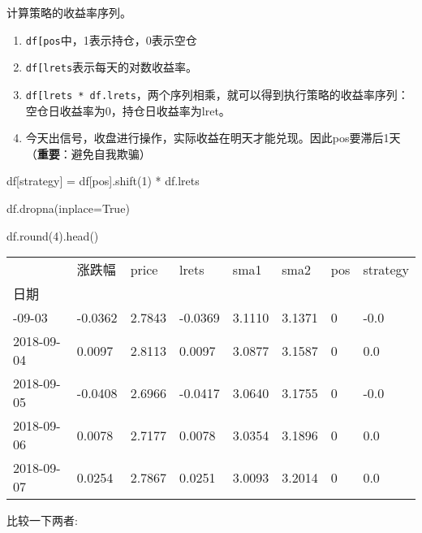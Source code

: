 \documentclass[
  letterpaper,
  DIV=11,
  numbers=noendperiod]{scrreprt}
\newenvironment{Shaded}{\begin{snugshade}}{\end{snugshade}}
\newcommand{\BuiltInTok}[1]{\textcolor[rgb]{0.00,0.23,0.31}{#1}}
\newcommand{\DecValTok}[1]{\textcolor[rgb]{0.68,0.00,0.00}{#1}}
\newcommand{\NormalTok}[1]{\textcolor[rgb]{0.00,0.23,0.31}{#1}}
\newcommand{\OperatorTok}[1]{\textcolor[rgb]{0.37,0.37,0.37}{#1}}
\newcommand{\StringTok}[1]{\textcolor[rgb]{0.13,0.47,0.30}{#1}}
\newcommand{\VariableTok}[1]{\textcolor[rgb]{0.07,0.07,0.07}{#1}}
\providecommand{\tightlist}{%
  \setlength{\itemsep}{0pt}\setlength{\parskip}{0pt}}\usepackage{longtable,booktabs,array}
\begin{document}
计算策略的收益率序列。

\begin{enumerate}
\def\labelenumi{\arabic{enumi}.}
\tightlist
\item
  \texttt{df{[}\textquotesingle{}pos\textquotesingle{}{]}}中，1表示持仓，0表示空仓
\item
  \texttt{df{[}\textquotesingle{}lrets\textquotesingle{}{]}}表示每天的对数收益率。
\item
  \texttt{df{[}\textquotesingle{}lrets\textquotesingle{}{]}\ *\ df.lrets}，两个序列相乘，就可以得到执行策略的收益率序列：空仓日收益率为0，持仓日收益率为lret。
\item
  今天出信号，收盘进行操作，实际收益在明天才能兑现。因此pos要滞后1天（\textbf{重要}：避免自我欺骗）
\end{enumerate}

\begin{Shaded}
\begin{Highlighting}[]
\NormalTok{df[}\StringTok{\textquotesingle{}strategy\textquotesingle{}}\NormalTok{] }\OperatorTok{=}\NormalTok{ df[}\StringTok{\textquotesingle{}pos\textquotesingle{}}\NormalTok{].shift(}\DecValTok{1}\NormalTok{) }\OperatorTok{*}\NormalTok{ df.lrets}

\NormalTok{df.dropna(inplace}\OperatorTok{=}\VariableTok{True}\NormalTok{)}

\NormalTok{df.}\BuiltInTok{round}\NormalTok{(}\DecValTok{4}\NormalTok{).head()}
\end{Highlighting}
\end{Shaded}

\begin{longtable}[]{@{}llllllll@{}}
\toprule\noalign{}
& 涨跌幅 & price & lrets & sma1 & sma2 & pos & strategy \\
日期 & & & & & & & \\
\midrule\noalign{}
\endhead
\bottomrule\noalign{}
\endlastfoot
2018-09-03 & -0.0362 & 2.7843 & -0.0369 & 3.1110 & 3.1371 & 0 & -0.0 \\
2018-09-04 & 0.0097 & 2.8113 & 0.0097 & 3.0877 & 3.1587 & 0 & 0.0 \\
2018-09-05 & -0.0408 & 2.6966 & -0.0417 & 3.0640 & 3.1755 & 0 & -0.0 \\
2018-09-06 & 0.0078 & 2.7177 & 0.0078 & 3.0354 & 3.1896 & 0 & 0.0 \\
2018-09-07 & 0.0254 & 2.7867 & 0.0251 & 3.0093 & 3.2014 & 0 & 0.0 \\
\end{longtable}

比较一下两者:
\end{document}
